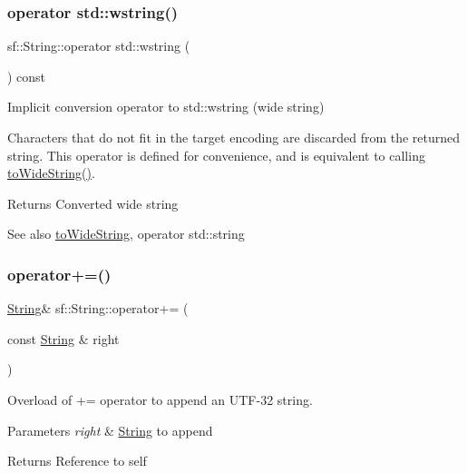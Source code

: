 \subsubsection{\texorpdfstring{operator std::wstring()}{operator std::wstring()}}
{\footnotesize\ttfamily sf\+::\+String\+::operator std\+::wstring (\begin{DoxyParamCaption}{ }\end{DoxyParamCaption}) const}



Implicit conversion operator to std\+::wstring (wide string) 

Characters that do not fit in the target encoding are discarded from the returned string. This operator is defined for convenience, and is equivalent to calling \mbox{\hyperlink{classsf_1_1_string_a9d81aa3103e7e2062bd85d912a5aecf1}{to\+Wide\+String()}}.

\begin{DoxyReturn}{Returns}
Converted wide string
\end{DoxyReturn}
\begin{DoxySeeAlso}{See also}
\mbox{\hyperlink{classsf_1_1_string_a9d81aa3103e7e2062bd85d912a5aecf1}{to\+Wide\+String}}, operator std\+::string \begin{DoxyVerb}\end{DoxyVerb}
 
\end{DoxySeeAlso}
\mbox{\label{classsf_1_1_string_ae6563ce2c243ae2160eea8a354199f4e}} 
\subsubsection{\texorpdfstring{operator+=()}{operator+=()}}
{\footnotesize\ttfamily \mbox{\hyperlink{classsf_1_1_string}{String}}\& sf\+::\+String\+::operator+= (\begin{DoxyParamCaption}\item[{const \mbox{\hyperlink{classsf_1_1_string}{String}} \&}]{right }\end{DoxyParamCaption})}



Overload of += operator to append an U\+T\+F-\/32 string. 


\begin{DoxyParams}{Parameters}
{\em right} & \mbox{\hyperlink{classsf_1_1_string}{String}} to append\\
\hline
\end{DoxyParams}
\begin{DoxyReturn}{Returns}
Reference to self \begin{DoxyVerb}\end{DoxyVerb}
 
\end{DoxyReturn}
\mbox{\label{classsf_1_1_string_a096255c066e5ef8c31952216b8ce9c42}} 
